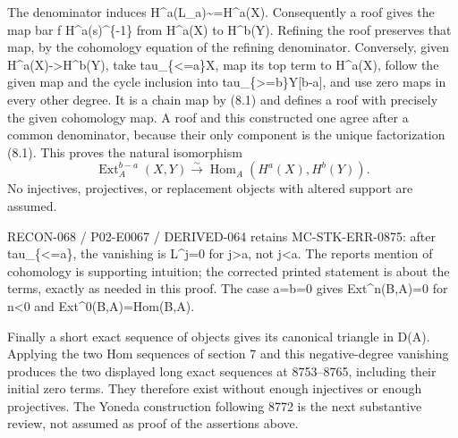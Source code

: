 \documentclass[11pt]{article}
\begin{document}
The denominator induces H\textasciicircum{}a(L\_\allowbreak{}a)\allowbreak{}\textasciitilde{}\allowbreak{}=H\textasciicircum{}a(X)\allowbreak{}. Consequently a roof gives the map bar f H\textasciicircum{}a(s)\allowbreak{}\textasciicircum{}\{-1\} from H\textasciicircum{}a(X)\allowbreak{} to H\textasciicircum{}b(Y)\allowbreak{}. Refining the roof preserves that map,\allowbreak{} by the cohomology equation of the refining denominator. Conversely,\allowbreak{} given H\textasciicircum{}a(X)\allowbreak{}\allowbreak{}->H\textasciicircum{}b(Y)\allowbreak{},\allowbreak{} take tau\_\allowbreak{}\{<\allowbreak{}=a\}X,\allowbreak{} map its top term to H\textasciicircum{}a(X)\allowbreak{},\allowbreak{} follow the given map and the cycle inclusion into tau\_\allowbreak{}\{>\allowbreak{}=b\}Y[b-a]\allowbreak{},\allowbreak{} and use zero maps in every other degree. It is a chain map by (8.1)\allowbreak{} and defines a roof with precisely the given cohomology map. A roof and this constructed one agree after a common denominator,\allowbreak{} because their only component is the unique factorization (8.1)\allowbreak{}. This proves the natural isomorphism \[
 \operatorname{Ext}^{b-a}_A(X,Y)
   \xrightarrow{\sim}
 \operatorname{Hom}_A(H^a(X),H^b(Y)).                         \tag{8.2}
\] No injectives,\allowbreak{} projectives,\allowbreak{} or replacement objects with altered support are assumed.

RECON-068 /\allowbreak{} P02-E0067 /\allowbreak{} DERIVED-064 retains MC-STK-ERR-0875:\allowbreak{} after tau\_\allowbreak{}\{<\allowbreak{}=a\},\allowbreak{} the vanishing is L\textasciicircum{}j\allowbreak{}=0 for j>a,\allowbreak{} not j\textless a. The report\textquotesingle s mention of cohomology is supporting intuition; the corrected printed statement is about the terms,\allowbreak{} exactly as needed in this proof. The case a\allowbreak{}=b\allowbreak{}=0 gives Ext\textasciicircum{}n(B,\allowbreak{}A)\allowbreak{}\allowbreak{}=0 for n\textless0 and Ext\textasciicircum{}0(B,\allowbreak{}A)\allowbreak{}\allowbreak{}=Hom(B,\allowbreak{}A)\allowbreak{}.

Finally a short exact sequence of objects gives its canonical triangle in D(A)\allowbreak{}. Applying the two Hom sequences of section 7 and this negative-degree vanishing produces the two displayed long exact sequences at 8753–\allowbreak{}8765,\allowbreak{} including their initial zero terms. They therefore exist without enough injectives or enough projectives. The Yoneda construction following 8772 is the next substantive review,\allowbreak{} not assumed as proof of the assertions above.
\end{document}
